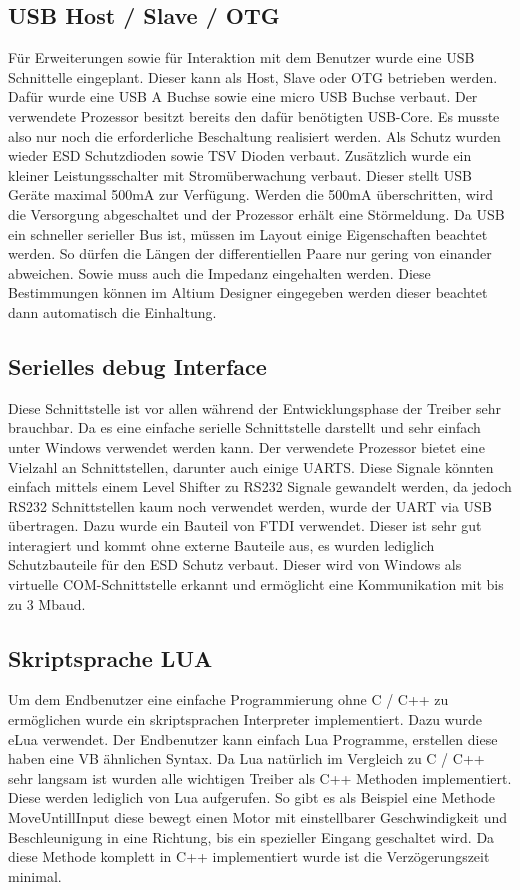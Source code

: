 \documentclass[praktikum,german]{hgbthesis}
\begin{document}
\subsection{USB Host / Slave / OTG}
Für Erweiterungen sowie für Interaktion mit dem Benutzer wurde eine USB Schnittelle eingeplant. Dieser kann als Host, Slave oder OTG betrieben werden. Dafür wurde eine USB A Buchse sowie eine micro USB Buchse verbaut. Der verwendete Prozessor besitzt bereits den dafür benötigten USB-Core. Es musste also nur noch die erforderliche Beschaltung realisiert werden. Als Schutz wurden wieder ESD Schutzdioden sowie TSV Dioden verbaut. Zusätzlich wurde ein kleiner Leistungsschalter mit Stromüberwachung verbaut. Dieser stellt USB Geräte maximal 500mA zur Verfügung. Werden die 500mA überschritten, wird die Versorgung abgeschaltet und der Prozessor erhält eine Störmeldung. Da USB ein schneller serieller Bus ist, müssen im Layout einige Eigenschaften beachtet werden. So dürfen die Längen der differentiellen Paare nur gering von einander abweichen. Sowie muss auch die Impedanz eingehalten werden. Diese Bestimmungen können im Altium Designer eingegeben werden dieser beachtet dann automatisch die Einhaltung.

\subsection{Serielles debug Interface}
Diese Schnittstelle ist vor allen während der Entwicklungsphase der Treiber sehr brauchbar. Da es eine einfache serielle Schnittstelle darstellt und sehr einfach unter Windows verwendet werden kann. Der verwendete Prozessor bietet eine Vielzahl an Schnittstellen, darunter auch einige UARTS. Diese Signale könnten einfach mittels einem Level Shifter zu RS232 Signale gewandelt werden, da jedoch RS232 Schnittstellen kaum noch verwendet werden, wurde der UART via USB übertragen. Dazu wurde ein Bauteil von FTDI verwendet. Dieser ist sehr gut interagiert und kommt ohne externe Bauteile aus, es wurden lediglich Schutzbauteile für den ESD Schutz verbaut. Dieser wird von Windows als virtuelle COM-Schnittstelle erkannt und ermöglicht eine Kommunikation mit bis zu 3 Mbaud.

\subsection{Skriptsprache LUA}
Um dem Endbenutzer eine einfache Programmierung ohne C / C++ zu ermöglichen wurde ein skriptsprachen Interpreter implementiert. Dazu wurde eLua verwendet. Der Endbenutzer kann einfach Lua Programme, erstellen diese haben eine VB ähnlichen Syntax. Da Lua natürlich im Vergleich zu C / C++ sehr langsam ist wurden alle wichtigen Treiber als C++ Methoden implementiert. Diese werden lediglich von Lua aufgerufen. So gibt es als Beispiel eine Methode MoveUntillInput diese bewegt einen Motor mit einstellbarer Geschwindigkeit und Beschleunigung in eine Richtung, bis ein spezieller Eingang geschaltet wird. Da diese Methode komplett in C++ implementiert wurde ist die Verzögerungszeit minimal.
\end{document}
